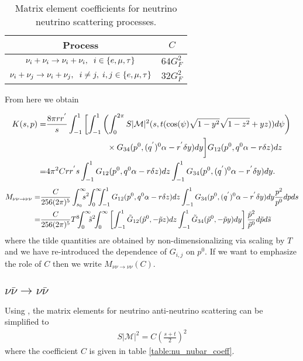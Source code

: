\begin{table}[H]
\centering 
\begin{tabular}{|c|c|}
\hline
Process &$C$ \\
\hline
$\nu_i+\nu_i\rightarrow\nu_i+\nu_i,\hspace{2mm} i\in\{e,\mu,\tau\}$& $64 G_F^2$\\
\hline
$\nu_i+\nu_j\rightarrow\nu_i+\nu_j,\hspace{2mm} i\neq j, \hspace{1mm} i,j\in\{e,\mu,\tau\}$& $32 G_F^2$\\
\hline
\end{tabular}
\caption{Matrix element coefficients for neutrino neutrino scattering processes.}
\label{table:nu_nu_coeff}
\end{table}
From here we obtain

\begin{align}
K(s,p)=&\frac{8\pi rr^{'}}{s}\int_{-1}^1 \left[\int_{-1}^1\left(\int_0^{2\pi}S|\mathcal{M}|^2 (s,t(\cos(\psi)\sqrt{1-y^2}\sqrt{1-z^2}+yz))d\psi\right)\right.\notag\\
&\hspace{26mm}\times G_{34}(p^0,(q^{'})^0\alpha-r^{'}\delta y) dy\bigg] G_{12}(p^0,q^0\alpha-r\delta z)dz\notag\\
=& 4\pi^2 Crr^{'}s \int_{-1}^1 G_{12}(p^0,q^0\alpha-r\delta z)dz \int_{-1}^1G_{34}(p^0,(q^{'})^0\alpha-r^{'}\delta y) dy.
\end{align}
{\small
\begin{align}
M_{\nu\nu\rightarrow\nu\nu}=&\frac{C}{256(2\pi)^5 }\int_{s_0}^\infty \!\!\!\!s^2\!\!\int_0^\infty\!\!\!\!\int_{-1}^1 G_{12}(p^0,q^0\alpha-r\delta z)dz \int_{-1}^1G_{34}(p^0,(q^{'})^0\alpha-r^{'}\delta y) dy\frac{ p^2}{p^0}dpds\notag\\
=&\frac{C}{256(2\pi)^5 } T^8\!\!\!\int_{0}^\infty\!\!\!\tilde{s}^2\!\!\int_0^\infty  \left[\int_{-1}^1 \tilde{G}_{12}(\tilde p^0,-\tilde{p} z)dz \int_{-1}^1\tilde{G}_{34}(\tilde p^0,-\tilde{p} y) dy\right]\frac{\tilde{p}^2}{\tilde{p}^0}d\tilde{p}d\tilde{s}
\end{align}
}
where the tilde quantities are obtained by non-dimensionalizing via scaling by $T$ and we have re-introduced the dependence of $G_{i,j}$ on $p^0$. If we want to emphasize the role of $C$ then we write $M_{\nu\nu\rightarrow\nu\nu}(C)$.




\subsection{$\nu\bar\nu\rightarrow \nu\bar\nu$ }
Using , the matrix elements for neutrino anti-neutrino scattering can be simplified to
\begin{align}
S|\mathcal{M}|^2=C\left(\frac{s+t}{2}\right)^2
\end{align}
where the coefficient $C$ is given in table \ref{table:nu_nubar_coeff}.

